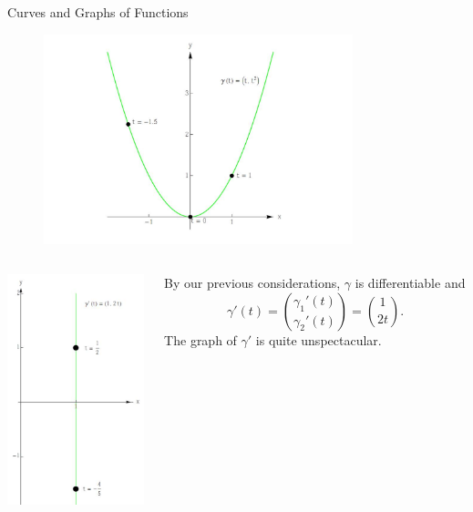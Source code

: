 \documentclass[smaller,hyperref={CJKbookmarks=true}]{beamer}
\begin{document}
\begin{frame}{Curves and Graphs of Functions}
\begin{spacing}{1}
\begin{figure}
  \centering
  \includegraphics[width=0.8\textwidth]{45.jpg}

\end{figure}
\newpage
\begin{columns}[c,onlytextwidth]
\begin{column}{0.35\textwidth}
\includegraphics[width=\columnwidth,height=190pt]{46.jpg}
\end{column}
\begin{column}{0.65\textwidth}
By our previous considerations, $\gamma$ is dif{}ferentiable and
\[\gamma'(t)=\binom{\gamma_1'(t)}{\gamma_2'(t)}=\binom{1}{2t}.\]
The graph of $\gamma'$ is quite unspectacular.
\end{column}
\end{columns}
\end{spacing}
\end{frame}
\end{document}
